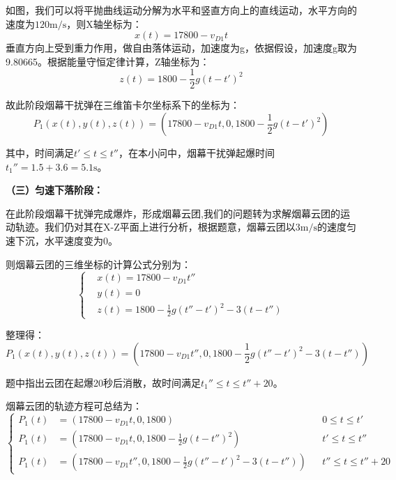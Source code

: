 \documentclass[withoutpreface,bwprint]{cumcmthesis}
\numberwithin{equation}{section} %
\numberwithin{figure}{section} %
\numberwithin{table}{section}  %
\begin{document}
如图，我们可以将平抛曲线运动分解为水平和竖直方向上的直线运动，水平方向的速度为$120\text{m/s}$，则X轴坐标为：
\begin{equation}
    x(t)=17800 - v_{D1}t
\end{equation}
垂直方向上受到重力作用，做自由落体运动，加速度为g，依据假设，加速度g取为9.80665。根据能量守恒定律计算，Z轴坐标为：
\begin{equation}
    z(t)=1800 - \frac{1}{2}g(t - t')^2
\end{equation}

故此阶段烟幕干扰弹在三维笛卡尔坐标系下的坐标为：
\begin{equation}
   P_1(x(t), y(t), z(t)) = \left(17800 - v_{D1}t,0, 1800 - \frac{1}{2}g(t - t')^2\right)
\end{equation}

其中，时间满足$t' \leq t \leq t''$，在本小问中，烟幕干扰弹起爆时间$t_{1}'' = 1.5 + 3.6 = 5.1\text{s}$。

\textbf{（三）匀速下落阶段：}

在此阶段烟幕干扰弹完成爆炸，形成烟幕云团,我们的问题转为求解烟幕云团的运动轨迹。我们仍对其在X-Z平面上进行分析，根据题意，烟幕云团以$3\text{m/s}$的速度匀速下沉，水平速度变为0。

则烟幕云团的三维坐标的计算公式分别为：
\begin{equation}
\left\{
\begin{aligned}
  & x(t) = 17800 - v_{D1}t''\\
  & y(t)=0 \\
  & z(t)=1800-\frac{1}{2}g(t''-t')^2-3(t-t'')
\end{aligned}
\right.
\end{equation}

整理得：
\begin{equation}
    P_1(x(t), y(t), z(t)) = \left(17800 - v_{D1}t'',0, 1800-\frac{1}{2}g(t''-t')^2-3(t-t'')\right)
\end{equation}

题中指出云团在起爆20秒后消散，故时间满足$t_{1}'' \leq t \leq t''+20$。

烟幕云团的轨迹方程可总结为：
\begin{equation}
\left\{
\begin{aligned}
P_1(t) &= (17800 - v_{D1}t, 0, 1800) 
    && 0 \le t \le t' \\
P_1(t) &= \left(17800 - v_{D1}t,0, 1800 - \frac{1}{2}g(t - t'')^2\right) 
    && t' \le t \le t'' \\
P_1(t) &= \left(17800 - v_{D1}t'',0, 1800-\frac{1}{2}g(t''-t')^2-3(t-t'')\right)
    && t''\le t \le t''+20
\end{aligned}
\right.
\end{equation}
\end{document}
